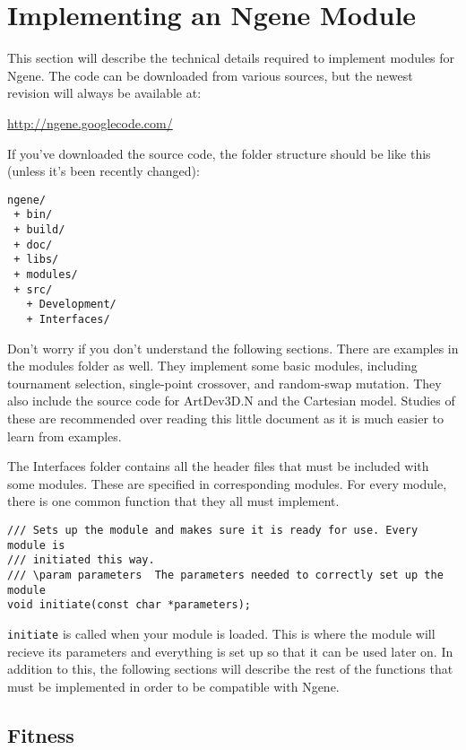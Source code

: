 \appendix

\section{Implementing an Ngene Module}
This section will describe the technical details required to implement modules for Ngene. The code can be downloaded from various sources, but the newest revision will always be available at:

\url{http://ngene.googlecode.com/}

If you've downloaded the source code, the folder structure should be like this (unless it's been recently changed):

\begin{verbatim}
ngene/
 + bin/
 + build/
 + doc/
 + libs/
 + modules/
 + src/
   + Development/
   + Interfaces/
\end{verbatim}

\noindent Don't worry if you don't understand the following sections. There are examples in the modules folder as well. They implement some basic modules, including tournament selection, single-point crossover, and random-swap mutation. They also include the source code for ArtDev3D.N and the Cartesian model. Studies of these are recommended over reading this little document as it is much easier to learn from examples.

The Interfaces folder contains all the header files that must be included with some modules. These are specified in corresponding modules. For every module, there is one common function that they all must implement.

\begin{verbatim}
/// Sets up the module and makes sure it is ready for use. Every module is
/// initiated this way.
/// \param parameters  The parameters needed to correctly set up the module
void initiate(const char *parameters);
\end{verbatim}

\noindent\texttt{initiate} is called when your module is loaded. This is where the module will recieve its parameters and everything is set up so that it can be used later on. In addition to this, the following sections will describe the rest of the functions that must be implemented in order to be compatible with Ngene.

\subsection{Fitness}

